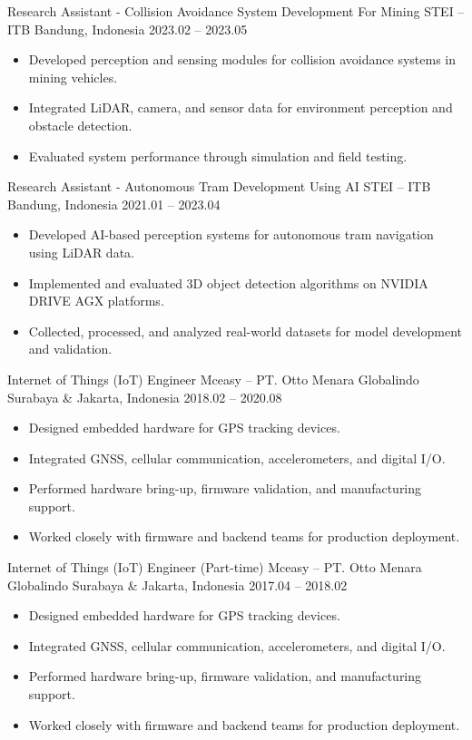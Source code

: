 \begin{sectionbody}
\cventry
    {Research Assistant - Collision Avoidance System Development For Mining}
    {STEI -- ITB}
    {Bandung, Indonesia}
    {2023.02 -- 2023.05}
    {
        \begin{itemize}[itemsep=1pt, topsep=2pt]
            \item Developed perception and sensing modules for collision avoidance systems in mining vehicles.
            \item Integrated LiDAR, camera, and sensor data for environment perception and obstacle detection.
            \item Evaluated system performance through simulation and field testing.
        \end{itemize}
    }

\cventry
    {Research Assistant - Autonomous Tram Development Using AI}
    {STEI -- ITB}
    {Bandung, Indonesia}
    {2021.01 -- 2023.04}
    {
        \begin{itemize}[itemsep=1pt, topsep=2pt]
            \item Developed AI-based perception systems for autonomous tram navigation using LiDAR data.
            \item Implemented and evaluated 3D object detection algorithms on NVIDIA DRIVE AGX platforms.
            \item Collected, processed, and analyzed real-world datasets for model development and validation.
        \end{itemize}
    }

\cventry
    {Internet of Things (IoT) Engineer}
    {Mceasy -- PT. Otto Menara Globalindo}
    {Surabaya \& Jakarta, Indonesia}
    {2018.02 -- 2020.08}
    {
        \begin{itemize}[itemsep=1pt, topsep=2pt]
            \item Designed embedded hardware for GPS tracking devices.
            \item Integrated GNSS, cellular communication, accelerometers, and digital I/O.
            \item Performed hardware bring-up, firmware validation, and manufacturing support.
            \item Worked closely with firmware and backend teams for production deployment.
        \end{itemize}
    }

\cventry
    {Internet of Things (IoT) Engineer (Part-time)}
    {Mceasy -- PT. Otto Menara Globalindo}
    {Surabaya \& Jakarta, Indonesia}
    {2017.04 -- 2018.02}
    {
        \begin{itemize}[itemsep=1pt, topsep=2pt]
            \item Designed embedded hardware for GPS tracking devices.
            \item Integrated GNSS, cellular communication, accelerometers, and digital I/O.
            \item Performed hardware bring-up, firmware validation, and manufacturing support.
            \item Worked closely with firmware and backend teams for production deployment.
        \end{itemize}
    }


\end{sectionbody}
